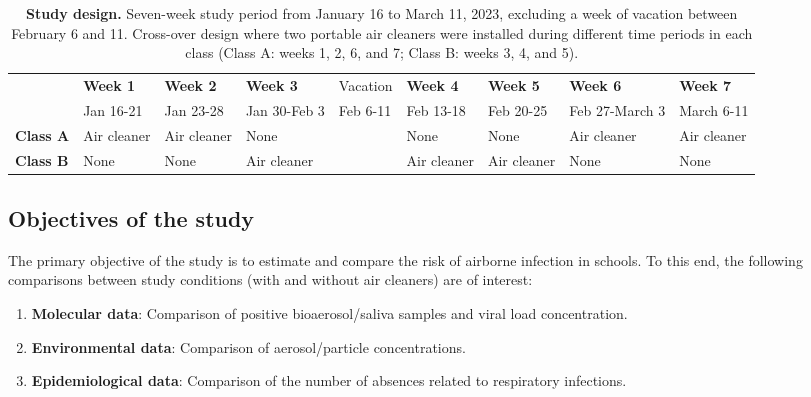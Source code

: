 \documentclass{article}
\begin{document}
\begin{table}[!htpb]
    \footnotesize
    \centering
    \caption{\textbf{Study design.} Seven-week study period from January 16 to March 11, 2023, excluding a week of vacation between February 6 and 11. Cross-over design where two portable air cleaners were installed during different time periods in each class (Class A: weeks 1, 2, 6, and 7; Class B: weeks 3, 4, and 5).}
    \begin{tabular}{l l l l l l l l l}
    \toprule
      & \textbf{Week 1} & \textbf{Week 2} & \textbf{Week 3} & Vacation & \textbf{Week 4} & \textbf{Week 5} & \textbf{Week 6} & \textbf{Week 7} \\
      & Jan 16-21 & Jan 23-28 & Jan 30-Feb 3 & Feb 6-11 & Feb 13-18 & Feb 20-25 & Feb 27-March 3 & March 6-11 \\
      \midrule
      \textbf{Class A} & \cellcolor{gray!50} Air cleaner & \cellcolor{gray!50} Air cleaner & \cellcolor{gray!10} None & & \cellcolor{gray!10} None & \cellcolor{gray!10} None & \cellcolor{gray!50} Air cleaner & \cellcolor{gray!50} Air cleaner \\
      \textbf{Class B} & \cellcolor{gray!10} None & \cellcolor{gray!10} None & \cellcolor{gray!50} Air cleaner & & \cellcolor{gray!50} Air cleaner & \cellcolor{gray!50} Air cleaner & \cellcolor{gray!10} None & \cellcolor{gray!10} None \\
      \bottomrule
    \end{tabular}
    \label{tab:study_design}
\end{table}

\subsection{Objectives of the study}

The primary objective of the study is to estimate and compare the risk of airborne infection in schools. To this end, the following comparisons between study conditions (with and without air cleaners) are of interest:

\begin{enumerate}
    \item \textbf{Molecular data}: Comparison of positive bioaerosol/saliva samples and viral load concentration.
    \item \textbf{Environmental data}: Comparison of aerosol/particle concentrations.
    \item \textbf{Epidemiological data}: Comparison of the number of absences related to respiratory infections.  
\end{enumerate}
\end{document}
